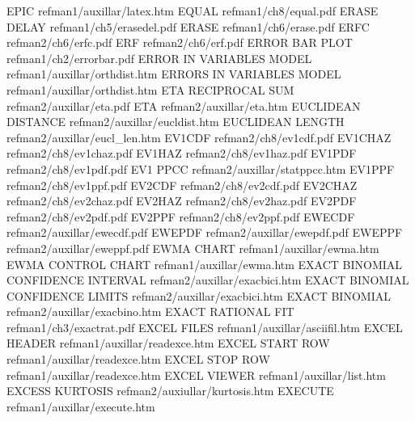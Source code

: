 EPIC                                    refman1/auxillar/latex.htm
EQUAL                                   refman1/ch8/equal.pdf
ERASE DELAY                             refman1/ch5/erasedel.pdf
ERASE                                   refman1/ch6/erase.pdf
ERFC                                    refman2/ch6/erfc.pdf
ERF                                     refman2/ch6/erf.pdf
ERROR BAR PLOT                          refman1/ch2/errorbar.pdf
ERROR IN VARIABLES MODEL                refman1/auxillar/orthdist.htm
ERRORS IN VARIABLES MODEL               refman1/auxillar/orthdist.htm
ETA RECIPROCAL SUM                      refman2/auxillar/eta.pdf
ETA                                     refman2/auxillar/eta.htm
EUCLIDEAN DISTANCE                      refman2/auxillar/eucldist.htm
EUCLIDEAN LENGTH                        refman2/auxillar/eucl_len.htm
EV1CDF                                  refman2/ch8/ev1cdf.pdf
EV1CHAZ                                 refman2/ch8/ev1chaz.pdf
EV1HAZ                                  refman2/ch8/ev1haz.pdf
EV1PDF                                  refman2/ch8/ev1pdf.pdf
EV1 PPCC                                refman2/auxillar/statppcc.htm
EV1PPF                                  refman2/ch8/ev1ppf.pdf
EV2CDF                                  refman2/ch8/ev2cdf.pdf
EV2CHAZ                                 refman2/ch8/ev2chaz.pdf
EV2HAZ                                  refman2/ch8/ev2haz.pdf
EV2PDF                                  refman2/ch8/ev2pdf.pdf
EV2PPF                                  refman2/ch8/ev2ppf.pdf
EWECDF                                  refman2/auxillar/ewecdf.pdf
EWEPDF                                  refman2/auxillar/ewepdf.pdf
EWEPPF                                  refman2/auxillar/eweppf.pdf
EWMA CHART                              refman1/auxillar/ewma.htm
EWMA CONTROL CHART                      refman1/auxillar/ewma.htm
EXACT BINOMIAL CONFIDENCE INTERVAL      refman2/auxillar/exacbici.htm
EXACT BINOMIAL CONFIDENCE LIMITS        refman2/auxillar/exacbici.htm
EXACT BINOMIAL                          refman2/auxillar/exacbino.htm
EXACT RATIONAL FIT                      refman1/ch3/exactrat.pdf
EXCEL FILES                             refman1/auxillar/asciifil.htm
EXCEL HEADER                            refman1/auxillar/readexce.htm
EXCEL START ROW                         refman1/auxillar/readexce.htm
EXCEL STOP ROW                          refman1/auxillar/readexce.htm
EXCEL VIEWER                            refman1/auxillar/list.htm
EXCESS KURTOSIS                         refman2/auxiullar/kurtosis.htm
EXECUTE                                 refman1/auxillar/execute.htm
